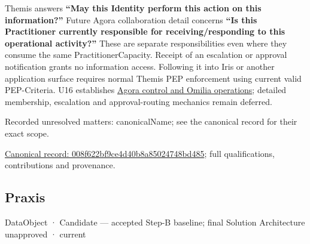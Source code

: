 Themis answers \textbf{“May this Identity perform this action on this information?”}
Future Agora collaboration detail concerns \textbf{“Is this Practitioner currently
responsible for receiving/responding to this operational activity?”} These are
separate responsibilities even where they consume the same PractitionerCapacity.
Receipt of an escalation or approval notification grants no information access.
Following it into Iris or another application surface requires normal Themis PEP
enforcement using current valid PEP-Criteria. U16 establishes
\hyperref[element:d1c4053e68384080b8eb79d2008632ba]{Agora control and Omilia operations};
detailed membership, escalation and approval-routing mechanics remain deferred.


{\small Recorded unresolved matters: canonicalName; see the canonical record for their exact scope.}\par
{\footnotesize \href{../../../../continuum/application/data-object/008f622bf9ce4d40b8a85024748bd485.md}{Canonical record: 008f622bf9ce4d40b8a85024748bd485}; full qualifications, contributions and provenance.}\par
\subsection{Praxis}

\label{element:0f961462340348b290fd844357d54d67}
{\small DataObject · Candidate — accepted Step-B baseline; final Solution Architecture unapproved · current}\par

